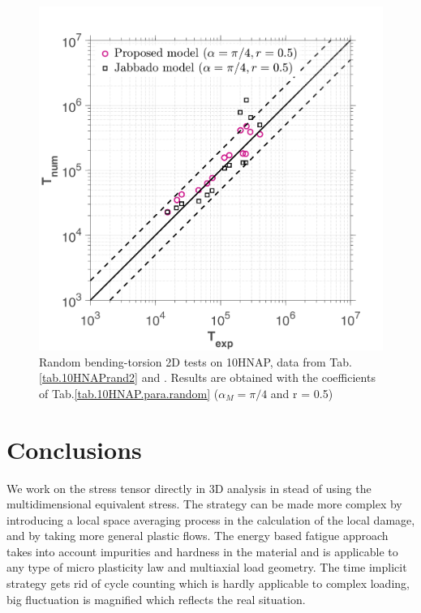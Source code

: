 \documentclass[3p,times,procedia,number]{elsarticle}
\begin{document}
\begin{figure}[!h]
	\centering
	\includegraphics[width=\textwidth]{figures//HNAP_random_r05_error.png} 
	\caption{Random bending-torsion 2D tests on 10HNAP, data from Tab.\ref{tab.10HNAPrand2} and \cite{jabbado:pastel-00002116}. Results are obtained with the coefficients of Tab.\ref{tab.10HNAP.para.random} ($\alpha_{M} = \pi/4$ and r = 0.5)}
	\label{fig.10HNAP_random05}
\end{figure}


\clearpage
\section{Conclusions}

We work on the stress tensor directly in 3D analysis in stead of using the multidimensional equivalent stress.
The strategy can be made more complex by introducing a local space averaging process in the calculation of the local damage, and by taking more general plastic flows. The energy based fatigue approach takes into account impurities and hardness in the material and is applicable to any type of micro plasticity law and multiaxial load geometry. The time implicit strategy gets rid of cycle counting which is hardly applicable to complex loading, big fluctuation is magnified which reflects the real situation.
\end{document}
